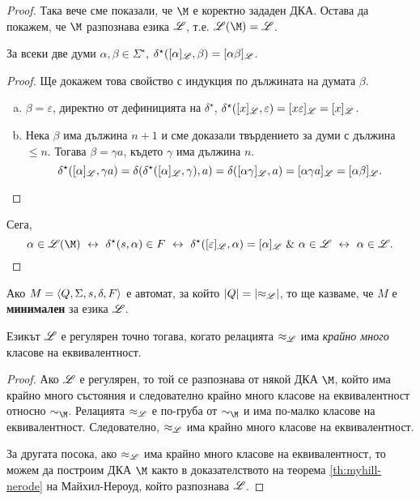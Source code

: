 \begin{proof}
  Така вече сме показали, че $\M$ е коректно зададен ДКА.
  Остава да покажем, че $\M$ разпознава езика $\mathscr{L}$, т.е. $\Ls(\M) = \Ls$.
  \begin{prop}
    За всеки две думи $\alpha,\beta\in\Sigma^\star$,
    $\delta^\star([\alpha]_{\mathscr{L}},\beta) = [\alpha\beta]_{\mathscr{L}}$.
  \end{prop}
  \begin{proof}
    Ще докажем това свойство с индукция по дължината на думата $\beta$.
    \begin{enumerate}[a)]
    \item
      $\beta = \varepsilon$, директно от дефиницията на $\delta^\star$,
      $\delta^\star([x]_{\mathscr{L}},\varepsilon) = [x\varepsilon]_{\mathscr{L}} = [x]_{\mathscr{L}}$.
    \item
      Нека $\beta$ има дължина $n+1$ и сме доказали твърдението за думи с дължина $\leq n$.
      Тогава $\beta = \gamma a$, където $\gamma$ има дължина $n$.
      \[\delta^\star([\alpha]_{\mathscr{L}}, \gamma a) = \delta(\delta^\star([\alpha]_{\mathscr{L}},\gamma),a) = \delta([\alpha\gamma]_{\mathscr{L}},a) = [\alpha\gamma a]_{\mathscr{L}} = [\alpha\beta]_{\mathscr{L}}.\]
    \end{enumerate}
  \end{proof}
  Сега, 
  \[\alpha\in \Ls(\M) \iff \delta^\star(s,\alpha) \in F \iff \delta^\star([\varepsilon]_\Ls,\alpha) = [\alpha]_\Ls\ \&\ \alpha\in \Ls \iff \alpha \in \Ls.\]
  
\end{proof}

Ако $M = \langle{Q,\Sigma,s,\delta,F}\rangle$ е автомат, за който $\vert{Q}\vert = \vert{\approx_{\mathscr{L}}}\vert$, то ще казваме, че
$M$ е {\bf минимален} за езика $\mathscr{L}$.

\begin{framed}
  \begin{cor}
    Езикът $\mathscr{L}$ е регулярен точно тогава, когато релацията $\approx_{\mathscr{L}}$ има {\em крайно много} класове на еквивалентност.
  \end{cor}
\end{framed}
\begin{proof}
  Ако $\mathscr{L}$ е регулярен, то той се разпознава от някой ДКА $\M$, който има крайно много състояния 
  и следователно крайно много класове на еквивалентност относно $\sim_\M$.
  Релацията $\approx_{\mathscr{L}}$ е по-груба от $\sim_\M$ и има по-малко класове на еквивалентност.
  Следователно, $\approx_{\mathscr{L}}$ има крайно много класове на еквивалентност.
  
  За другата посока, ако $\approx_{\mathscr{L}}$ има крайно много класове на еквивалентност, то можем да 
  построим ДКА $\M$ както в доказателството на теорема \ref{th:myhill-nerode} на Майхил-Нероуд,
  който разпознава $\mathscr{L}$.
  
\end{proof}

